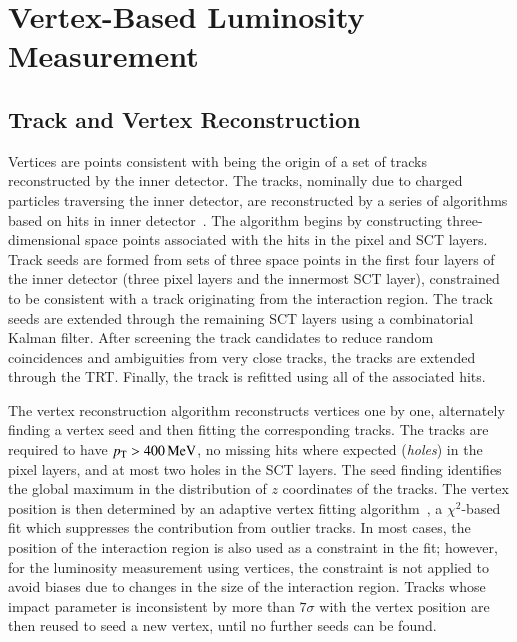 \section{Vertex-Based Luminosity Measurement}

\subsection{Track and Vertex Reconstruction}

Vertices are points consistent with being the origin of a set of tracks reconstructed by the inner detector. The tracks, nominally due to charged particles traversing the inner detector, are reconstructed by a series of algorithms based on hits in inner detector~\cite{TheATLASCollaboration:2010vk}. The algorithm begins by constructing three-dimensional space points associated with the hits in the pixel and SCT layers. Track seeds are formed from sets of three space points in the first four layers of the inner detector (three pixel layers and the innermost SCT layer), constrained to be consistent with a track originating from the interaction region. The track seeds are extended through the remaining SCT layers using a combinatorial Kalman filter. After screening the track candidates to reduce random coincidences and ambiguities from very close tracks, the tracks are extended through the TRT. Finally, the track is refitted using all of the associated hits. 

The vertex reconstruction algorithm reconstructs vertices one by one, alternately finding a vertex seed and then fitting the corresponding tracks. The tracks are required to have $p_{\text{T}}>\SI{400}{\mega\electronvolt}$, no missing hits where expected (\emph{holes}) in the pixel layers, and at most two holes in the SCT layers. The seed finding identifies the global maximum in the distribution of $z$ coordinates of the tracks. The vertex position is then determined by an adaptive vertex fitting algorithm~\cite{Fruhwirth:2007hz}, a $\chi^2$-based fit which suppresses the contribution from outlier tracks. In most cases, the position of the interaction region is also used as a constraint in the fit; however, for the luminosity measurement using vertices, the constraint is not applied to avoid biases due to changes in the size of the interaction region. Tracks whose impact parameter is inconsistent by more than $7\sigma$ with the vertex position are then reused to seed a new vertex, until no further seeds can be found. 

